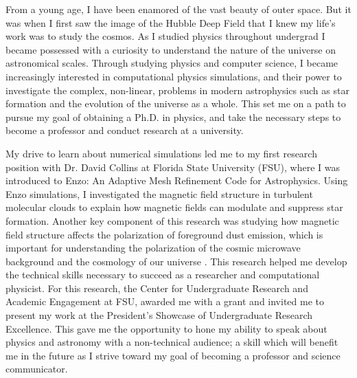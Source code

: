 \documentclass[letterpaper, 12pt]{article}
\begin{document}

From a young age, I have been enamored of the vast beauty of outer space. But it was when I first saw the image of the Hubble Deep Field that I knew my life’s work was to study the cosmos. As I studied physics throughout undergrad I became possessed with a curiosity to understand the nature of the universe on astronomical scales. Through studying physics and computer science, I became increasingly interested in computational physics simulations, and their power to investigate the complex, non-linear, problems in modern astrophysics such as star formation and the evolution of the universe as a whole. This set me on a path to pursue my goal of obtaining a Ph.D. in physics, and take the necessary steps to become a professor and conduct research at a university.

My drive to learn about numerical simulations led me to my first research position with Dr. David Collins at Florida State University (FSU), where I was introduced to Enzo: An Adaptive Mesh Refinement Code for Astrophysics. Using Enzo simulations, I investigated the magnetic field structure in turbulent molecular clouds to explain how magnetic fields can modulate and suppress star formation. Another key component of this research was studying how magnetic field structure affects the polarization of foreground dust emission, which is important for understanding the polarization of the cosmic microwave background and the cosmology of our universe \citep{Clark2015}. This research helped me develop the technical skills necessary to succeed as a researcher and computational physicist. For this research, the Center for Undergraduate Research and Academic Engagement at FSU, awarded me with a grant and invited me to present my work at the President’s Showcase of Undergraduate Research Excellence. This gave me the opportunity to hone my ability to speak about physics and astronomy with a non-technical audience; a skill which will benefit me in the future as I strive toward my goal of becoming a professor and science communicator.
\end{document}
